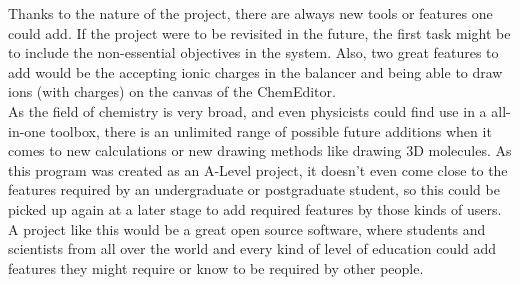 \documentclass[a4paper,12pt]{article}
\begin{document}
Thanks to the nature of the project, there are always new tools or features one could add. If the project were to be revisited in the future, the first task might be to include the non-essential objectives in the system. Also, two great features to add would be the accepting ionic charges in the balancer and being able to draw ions (with charges) on the canvas of the ChemEditor.\\
As the field of chemistry is very broad, and even physicists could find use in a all-in-one toolbox, there is an unlimited range of possible future additions when it comes to new calculations or new drawing methods like drawing 3D molecules. As this program was created as an A-Level project, it doesn't even come close to the features required by an undergraduate or postgraduate student, so this could be picked up again at a later stage to add required features by those kinds of users.\\ 
A project like this would be a great open source software, where students and scientists from all over the world and every kind of level of education could add features they might require or know to be required by other people.

\newpage
\end{document}
